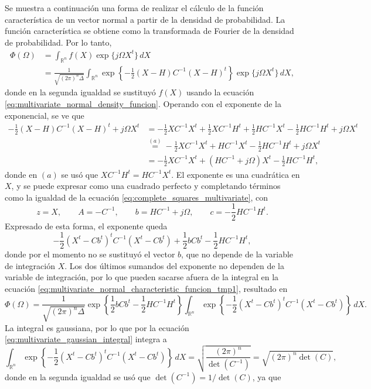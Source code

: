 \documentclass[a4paper]{report}
\begin{document}
Se muestra a continuación una forma de realizar el cálculo de la función característica de un vector normal a partir de la densidad de probabilidad. La función característica se obtiene como la transformada de Fourier de la densidad de probabilidad. Por lo tanto,
\begin{align}\label{eq:multivariate_normal_characteristic_funcion_tmp1}
 \Phi(\Omega)&=\int_{{\mathbb{R}^n}}f(X)\exp\{j\Omega X^t\}\,dX\nonumber\\
   &=\frac{1}{\sqrt{(2\pi)^n\Delta}}\int_{{\mathbb{R}^n}}\exp\left\{-\frac{1}{2}(X-H)C^{-1}(X-H)^t\right\}\exp\{j\Omega X^t\}\,dX,
\end{align}
donde en la segunda igualdad se sustituyó \(f(X)\) usando la ecuación \ref{eq:multivariate_normal_density_funcion}. Operando con el exponente de la exponencial, se ve que
\begin{align*}
 -\frac{1}{2}(X-H)C^{-1}(X-H)^t+j\Omega X^t&=-\frac{1}{2}XC^{-1}X^t+\frac{1}{2}XC^{-1}H^t+\frac{1}{2}HC^{-1}X^t-\frac{1}{2}HC^{-1}H^t+j\Omega X^t\\
  &\overset{(a)}{=}-\frac{1}{2}XC^{-1}X^t+HC^{-1}X^t-\frac{1}{2}HC^{-1}H^t+j\Omega X^t\\
  &=-\frac{1}{2}XC^{-1}X^t+(HC^{-1}+j\Omega)X^t-\frac{1}{2}HC^{-1}H^t,
\end{align*}
donde en \((a)\) se usó que \(XC^{-1}H^t=HC^{-1}X^t\). El exponente es una cuadrática en \(X\), y se puede expresar como una cuadrado perfecto y completando términos como la igualdad de la ecuación \ref{eq:complete_squares_multivariate}, con
\[
 z=X,\qquad A=-C^{-1},\qquad b=HC^{-1}+j\Omega,\qquad c=-\frac{1}{2}HC^{-1}H^t.
\]
Expresado de esta forma, el exponente queda
\[
 -\frac{1}{2}(X^t-Cb^t)^tC^{-1}(X^t-Cb^t)+\frac{1}{2}bCb^t-\frac{1}{2}HC^{-1}H^t,
\]
donde por el momento no se sustituyó el vector \(b\), que no depende de la variable de integración \(X\). Los dos últimos sumandos del exponente no dependen de la variable de integración, por lo que pueden sacarse afuera de la integral en la ecuación \ref{eq:multivariate_normal_characteristic_funcion_tmp1}, resultado en 
\[
 \Phi(\Omega)=\frac{1}{\sqrt{(2\pi)^n\Delta}}\exp\left\{\frac{1}{2}bCb^t-\frac{1}{2}HC^{-1}H^t\right\}\int_{{\mathbb{R}^n}}\exp\left\{-\frac{1}{2}(X^t-Cb^t)^tC^{-1}(X^t-Cb^t)\right\}\,dX.
\]
La integral es gaussiana, por lo que por la ecuación \ref{eq:multivariate_gaussian_integral} integra a 
\[
 \int_{{\mathbb{R}^n}}\exp\left\{-\frac{1}{2}(X^t-Cb^t)^tC^{-1}(X^t-Cb^t)\right\}\,dX=\sqrt{\frac{(2\pi)^n}{\det(C^{-1})}}=\sqrt{(2\pi)^n\det(C)},
\]
donde en la segunda igualdad se usó que \(\det(C^{-1})=1/\det(C)\), ya que
\end{document}

